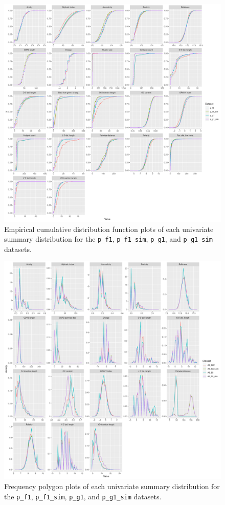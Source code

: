 \documentclass{article}
\begin{document}
\begin{figure}
    \includegraphics[width=\linewidth]{Figures/partis_ecdf.pdf}
    \caption{Empirical cumulative distribution function plots of each univariate summary distribution for the \texttt{p\_f1}, \texttt{p\_f1\_sim}, \texttt{p\_g1}, and \texttt{p\_g1\_sim} datasets.}
    \label{fig:MasterPlotECDF}
\end{figure}

\begin{figure}
    \includegraphics[width=\linewidth]{Figures/igor_freqpoly.pdf}
    \caption{Frequency polygon plots of each univariate summary distribution for the \texttt{p\_f1}, \texttt{p\_f1\_sim}, \texttt{p\_g1}, and \texttt{p\_g1\_sim} datasets.}
    \label{fig:MasterPlot}
\end{figure}
\end{document}
